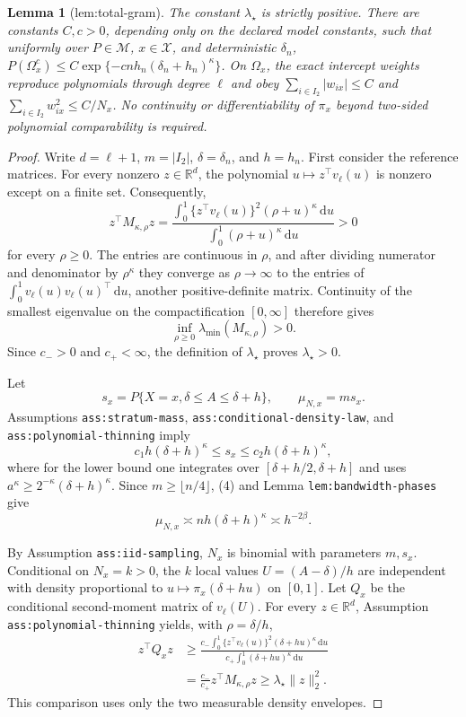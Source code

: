 \documentclass{article}
\newtheorem{lemma}{Lemma}
\begin{document}
\begin{lemma}[lem:total-gram]\label{lem:total-gram}
The constant \(\lambda_\star\) is strictly positive. There are constants \(C,c>0\), depending only on the declared model constants, such that uniformly over \(P\in\mathcal M\), \(x\in\mathcal X\), and deterministic \(\delta_n\), \(P(\Omega_x^c)\leq C\exp\{-c n h_n(\delta_n+h_n)^\kappa\}\). On \(\Omega_x\), the exact intercept weights reproduce polynomials through degree \(\ell\) and obey \(\sum_{i\in I_2}|w_{ix}|\leq C\) and \(\sum_{i\in I_2}w_{ix}^2\leq C/N_x\). No continuity or differentiability of \(\pi_x\) beyond two-sided polynomial comparability is required.
\end{lemma}
\begin{proof}
Write \(d=\ell+1\), \(m=|I_2|\), \(\delta=\delta_n\), and \(h=h_n\).  First consider the reference matrices.  For every nonzero \(z\in\mathbb R^d\), the polynomial \(u\mapsto z^\top v_\ell(u)\) is nonzero except on a finite set.  Consequently,
\[
 z^\top M_{\kappa,\rho}z
 =\frac{\int_0^1\{z^\top v_\ell(u)\}^2(\rho+u)^\kappa\,\mathrm du}
        {\int_0^1(\rho+u)^\kappa\,\mathrm du}>0
\]
for every \(\rho\geq0\).  The entries are continuous in \(\rho\), and after dividing numerator and denominator by \(\rho^\kappa\) they converge as \(\rho\to\infty\) to the entries of \(\int_0^1v_\ell(u)v_\ell(u)^\top\,\mathrm du\), another positive-definite matrix.  Continuity of the smallest eigenvalue on the compactification \([0,\infty]\) therefore gives
\[
 \inf_{\rho\geq0}\lambda_{\min}(M_{\kappa,\rho})>0.
\]
Since \(c_->0\) and \(c_+<\infty\), the definition of \(\lambda_\star\) proves \(\lambda_\star>0\).

Let
\[
 s_x=P\{X=x,\delta\leq A\leq\delta+h\},
 \qquad \mu_{N,x}=ms_x.
\]
Assumptions \texttt{ass:stratum-mass}, \texttt{ass:conditional-density-law}, and \texttt{ass:polynomial-thinning} imply
\[
 c_1h(\delta+h)^\kappa\leq s_x\leq c_2h(\delta+h)^\kappa, \tag{4}
\]
where for the lower bound one integrates over \([\delta+h/2,\delta+h]\) and uses \(a^\kappa\geq2^{-\kappa}(\delta+h)^\kappa\).  Since \(m\geq\lfloor n/4\rfloor\), (4) and Lemma \texttt{lem:bandwidth-phases} give
\[
 \mu_{N,x}\asymp nh(\delta+h)^\kappa\asymp h^{-2\beta}. \tag{5}
\]

By Assumption \texttt{ass:iid-sampling}, \(N_x\) is binomial with parameters \(m,s_x\).  Conditional on \(N_x=k>0\), the \(k\) local values \(U=(A-\delta)/h\) are independent with density proportional to \(u\mapsto\pi_x(\delta+hu)\) on \([0,1]\).  Let \(Q_x\) be the conditional second-moment matrix of \(v_\ell(U)\).  For every \(z\in\mathbb R^d\), Assumption \texttt{ass:polynomial-thinning} yields, with \(\rho=\delta/h\),
\[
 \begin{aligned}
 z^\top Q_xz
 &\geq\frac{c_-\int_0^1\{z^\top v_\ell(u)\}^2(\delta+hu)^\kappa\,\mathrm du}
              {c_+\int_0^1(\delta+hu)^\kappa\,\mathrm du}\\
 &=\frac{c_-}{c_+}z^\top M_{\kappa,\rho}z
 \geq\lambda_\star\lVert z\rVert_2^2.
 \end{aligned} \tag{6}
\]
This comparison uses only the two measurable density envelopes.


\end{proof}
\end{document}
